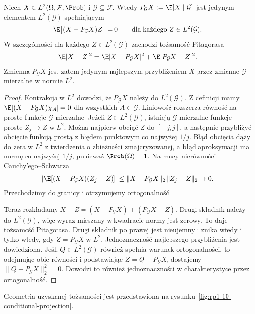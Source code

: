 \begin{twierdzenie}
Niech $X\in L^2(\Omega,\mathcal F,\Prob)$ i
$\mathcal G\subseteq\mathcal F$. Wtedy
$P_{\mathcal G}X:=\E[X\mid\mathcal G]$ jest
jedynym elementem $L^2(\mathcal G)$ spełniającym
\[
\E\big[(X-P_{\mathcal G}X)Z\big]=0
\qquad\text{dla każdego } Z\in L^2(\mathcal G).
\]
W szczególności dla każdego $Z\in L^2(\mathcal G)$
zachodzi tożsamość Pitagorasa
\[
\E|X-Z|^2
=\E|X-P_{\mathcal G}X|^2
+\E|P_{\mathcal G}X-Z|^2.
\]
Zmienna $P_{\mathcal G}X$ jest zatem jedynym
najlepszym przybliżeniem $X$ przez zmienne
$\mathcal G$-mierzalne w normie $L^2$.
\end{twierdzenie}
\begin{proof}
Kontrakcja w $L^2$ dowodzi, że $P_{\mathcal G}X$
należy do $L^2(\mathcal G)$. Z definicji mamy
$\E[(X-P_{\mathcal G}X)\chi_{A}]=0$
dla wszystkich $A\in\mathcal G$.
Liniowość rozszerza równość na proste funkcje
$\mathcal G$-mierzalne. Jeżeli $Z\in L^2(\mathcal G)$,
istnieją $\mathcal G$-mierzalne funkcje proste
$Z_j\to Z$ w $L^2$. Można najpierw obciąć $Z$ do
$[-j,j]$, a następnie przybliżyć obcięcie funkcją prostą
z błędem punktowym co najwyżej $1/j$.
Błąd obcięcia dąży do zera w $L^2$ z twierdzenia
o zbieżności zmajoryzowanej, a błąd aproksymacji
ma normę co najwyżej $1/j$, ponieważ $\Prob(\Omega)=1$.
Na mocy
nierówności Cauchy'ego--Schwarza
\[
\left|\E[(X-P_{\mathcal G}X)(Z_j-Z)]\right|
\leq\|X-P_{\mathcal G}X\|_2\,\|Z_j-Z\|_2\to0.
\]
Przechodzimy do granicy i otrzymujemy ortogonalność.

Teraz rozkładamy
$X-Z=(X-P_{\mathcal G}X)+(P_{\mathcal G}X-Z)$.
Drugi składnik należy do $L^2(\mathcal G)$,
więc wyraz mieszany w kwadracie normy jest zerowy.
To daje tożsamość Pitagorasa. Drugi składnik
po prawej jest nieujemny i znika wtedy i tylko
wtedy, gdy $Z=P_{\mathcal G}X$ w $L^2$.
Jednoznaczność najlepszego przybliżenia jest dowiedziona.
Jeśli $Q\in L^2(\mathcal G)$ również spełnia warunek
ortogonalności, to odejmując obie równości i podstawiając
$Z=Q-P_{\mathcal G}X$, dostajemy
$\|Q-P_{\mathcal G}X\|_2^2=0$. Dowodzi to również
jednoznaczności w charakterystyce przez ortogonalność.
\end{proof}

Geometria uzyskanej tożsamości jest przedstawiona
na rysunku~\ref{fig:rp1-10-conditional-projection}.

